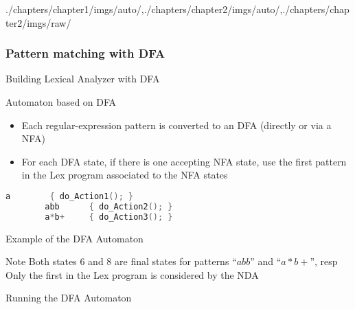 \begin{graphicspathcontext}{{./chapters/chapter1/imgs/auto/},{./chapters/chapter2/imgs/auto/},{./chapters/chapter2/imgs/raw/}}
\begin{bibunit}[apalike]
\subsubsection{Pattern matching with DFA}
\subsubsectiontableofcontentslide

\begin{frame}[fragile]{{Building Lexical Analyzer} with DFA}
	\begin{block}{Automaton based on DFA}
		\begin{itemize}
		\item Each regular-expression pattern is converted to an DFA (directly or via a NFA)
		\item For each DFA state, if there is one accepting NFA state, use the first pattern in the Lex program associated to the NFA states
		\end{itemize}
	\end{block}
	\vspace{1cm}
	\begin{example}
		\begin{lstlisting}[language=C,basicstyle={\normalsize}]
		a        { do_Action1(); }
		abb      { do_Action2(); }
		a*b+     { do_Action3(); }
		\end{lstlisting}
	\end{example}
\end{frame}

\begin{frame}{Example of the DFA Automaton}
	\centering{} \\[.25cm]
	\begin{block}{\small Note}\small
	Both states $6$ and $8$ are final states for patterns ``$abb$'' and ``$a*b+$'', resp \\
	Only the first in the Lex program is considered by the NDA
	\end{block}
\end{frame}

\begin{frame}{Running the DFA Automaton}
	\begin{rightarrowsequence}
	\end{rightarrowsequence}
\end{frame}


\end{bibunit}
\end{graphicspathcontext}
